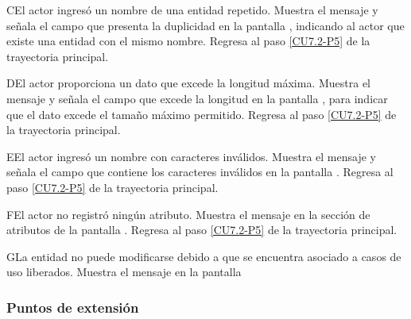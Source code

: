 	\begin{UCtrayectoriaA}{C}{El actor ingresó un nombre de una entidad repetido.}
		\UCpaso[\UCsist] Muestra el mensaje  y señala el campo que presenta la duplicidad en la pantalla , indicando al actor que existe una entidad con el mismo nombre.
		\UCpaso Regresa al paso \ref{CU7.2-P5} de la trayectoria principal.
	\end{UCtrayectoriaA}

	\begin{UCtrayectoriaA}{D}{El actor proporciona un dato que excede la longitud máxima.}
		\UCpaso[\UCsist] Muestra el mensaje  y señala el campo que excede la longitud en la pantalla , para indicar que el dato excede el tamaño máximo permitido.
		\UCpaso Regresa al paso \ref{CU7.2-P5} de la trayectoria principal.
	\end{UCtrayectoriaA}

	\begin{UCtrayectoriaA}{E}{El actor ingresó un nombre con caracteres inválidos.}
	\UCpaso[\UCsist] Muestra el mensaje  y señala el campo que contiene los caracteres inválidos en la pantalla .
	\UCpaso Regresa al paso \ref{CU7.2-P5} de la trayectoria principal.
	\end{UCtrayectoriaA}

	\begin{UCtrayectoriaA}{F}{El actor no registró ningún atributo.}
	\UCpaso[\UCsist] Muestra el mensaje  en la sección de atributos de la pantalla .
	\UCpaso Regresa al paso \ref{CU7.2-P5} de la trayectoria principal.
	\end{UCtrayectoriaA}


	\begin{UCtrayectoriaA}{G}{La entidad no puede modificarse debido a que se encuentra asociado a casos de uso liberados.}
		\UCpaso[\UCsist] Muestra el mensaje  en la pantalla 
	\end{UCtrayectoriaA}

\subsubsection{Puntos de extensión}

